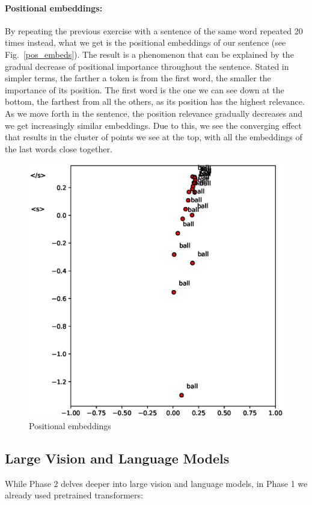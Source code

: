 \documentclass[runningheads]{llncs}
\begin{document}
\paragraph{Positional embeddings:}By repeating the previous exercise with a sentence of the same word repeated 20 times instead, what we get is the positional embeddings of our sentence (see Fig.~\ref{pos_embeds}). The result is a phenomenon that can be explained by the gradual decrease of positional importance throughout the sentence. Stated in simpler terms, the farther a token is from the first word, the smaller the importance of its position. The first word is the one we can see down at the bottom, the farthest from all the others, as its position has the highest relevance. As we move forth in the sentence, the position relevance gradually decreases and we get increasingly similar embeddings. Due to this, we see the converging effect that results in the cluster of points we see at the top, with all the embeddings of the last words close together.

\vspace{3\baselineskip plus 0.5\baselineskip minus 0.5\baselineskip} 

\begin{figure}[!htb]
  \centering
  \includegraphics[width=.5\textwidth, clip=true, trim = 15mm 0mm 0mm 0mm]{../figures/pos_embeds.eps}
  \caption{Positional embeddings}\label{pos_embeds}\label{img:positional_embeddings}
\end{figure}

\clearpage

\subsection{Large Vision and Language Models}
While Phase 2 delves deeper into large vision and language models, in Phase 1 we already used pretrained transformers:
\end{document}
